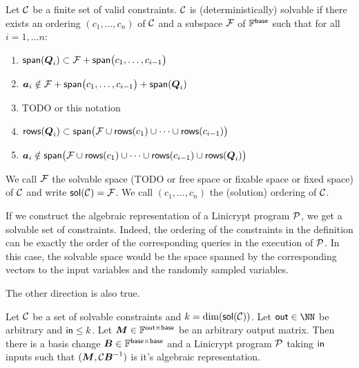 \begin{defn}[Solvable]
Let $\C$ be a finite set of valid constraints.
$\C$ is (deterministically) solvable if there exists an ordering $(c_1, \dots, c_n)$ of $\C$
and a subspace $\Fix$ of $\Base$
such that for all $i=1, \dots n$:
\begin{enumerate}
\item
    $\spn(\Q_i) \subset \Fix + \spn \big(c_1, \dots, c_{i-1} \big)$
\item
    $\va_i \notin \Fix + \spn \big(c_1, \dots, c_{i-1} \big) + \spn(\Q_i)$
\item
    TODO or this notation
\item
    $\rows(\Q_i) \subset \spn \big(\Fix \cup \rows(c_1) \cup \dots \cup \rows(c_{i-1})\big)$
\item
    $\va_i \notin \spn \big(\Fix \cup \rows(c_1) \cup \dots \cup \rows(c_{i-1}) \cup \rows(\Q_i) \big)$
\end{enumerate}

We call $\Fix$ the solvable space (TODO or free space or fixable space or fixed space) of $\C$
and write $\sol(\C) = \Fix$.
We call $(c_1, \dots, c_n)$ the (solution) ordering of $\C$.
\end{defn}

If we construct the algebraic representation of a Linicrypt program $\P$,
we get a solvable set of constraints.
Indeed, the ordering of the constraints in the definition can be exactly the order of the corresponding queries in the execution of $\P$.
In this case, the solvable space would be the space spanned by the corresponding vectors to the input variables and the randomly sampled variables.

The other direction is also true.

\begin{lemma}
    Let $\C$ be a set of solvable constraints and $k = \dim (\sol (\C))$.
    Let $\out \in \NN$ be arbitrary and $\inp \leq k$.
    Let $\M \in \F^{\out \times \base}$ be an arbitrary output matrix.
    Then there is a basis change $\B \in \F^{\base \times \base}$
    and a Linicrypt program $\P$ taking $\inp$ inputs
    such that $(\M, \C \B^{-1})$ is it's algebraic representation.
\end{lemma}

